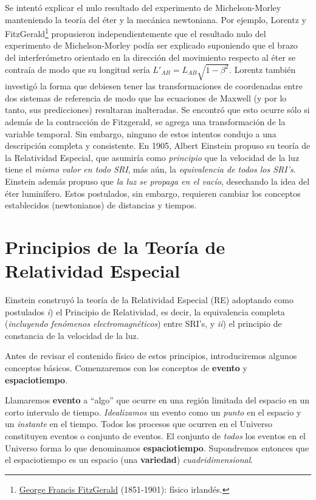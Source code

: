 Se intentó explicar el nulo resultado del experimento de Michelson-Morley manteniendo la teoría del éter y la mecánica newtoniana. Por ejemplo, Lorentz y FitzGerald\footnote{\href{{http://es.wikipedia.org/wiki/George_Francis_FitzGerald}}{George Francis FitzGerald} (1851-1901): físico irlandés.} propusieron independientemente que el resultado nulo del experimento de Michelson-Morley podía ser explicado suponiendo que el brazo del interferómetro orientado en la dirección del movimiento respecto al éter se contraía de modo que su longitud sería $L'_{AB}=L_{AB}\sqrt{1-\beta^2}$. Lorentz también investigó la forma que debiesen tener las transformaciones de coordenadas entre dos sistemas de referencia de modo que las ecuaciones de Maxwell (y por lo tanto, sus predicciones) resultaran inalteradas. Se encontró que esto ocurre sólo si además de la contracción de Fitzgerald, se agrega una transformación de la variable temporal. Sin embargo, ninguno de estos intentos condujo a una descripción completa y consistente. En 1905, Albert Einstein propuso su teoría de la Relatividad Especial, que asumiría como \textit{principio} que la velocidad de la luz tiene el \textit{mismo valor en todo SRI}, más aún, la \textit{equivalencia de todos los SRI's}. Einstein además propuso que \textit{la luz se propaga en el vacío}, desechando la idea del éter luminífero. Estos postulados, sin embargo, requieren cambiar los conceptos establecidos (newtonianos) de distancias y tiempos.

\section{Principios de la Teoría de Relatividad Especial}
Einstein construyó la teoría de la Relatividad Especial (RE) adoptando como postulados \textit{i}) el Principio de Relatividad, es decir, la equivalencia completa (\textit{incluyendo fenómenos electromagnéticos}) entre SRI's,  y \textit{ii}) el principio de constancia de la velocidad de la luz.

Antes de revisar el contenido físico de estos principios, introduciremos algunos conceptos básicos. Comenzaremos con los conceptos de \textbf{evento} y \textbf{espaciotiempo}.

Llamaremos \textbf{evento} a ``algo'' que ocurre en una región limitada del
espacio en un corto intervalo de tiempo. \textit{Idealizamos} un evento como un \textit{punto} en el espacio y un \textit{instante} en el tiempo. Todos los procesos que ocurren en el Universo constituyen eventos o conjunto de eventos.
El conjunto de \textit{todos} los eventos en el Universo forma lo que
denominamos \textbf{espaciotiempo}. Supondremos entonces que el espaciotiempo es un espacio (una \textbf{variedad}) \textit{cuadridimensional}.

